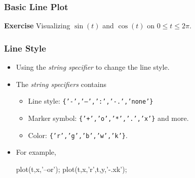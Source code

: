 \documentclass[compress]{beamer}  %
\begin{document}
\begin{frame}[fragile]
\frametitle{Basic Line Plot}
\textbf{Exercise} 
Visualizing $\sin(t)$ and $\cos(t)$ on $0 \leq t \leq 2\pi$. \pause
\begin{figure}[htb]
        \centering
\end{figure}

\end{frame}
\begin{frame}[fragile]
\frametitle{Line Style}

\begin{itemize}[<+->]
    \item Using the \textit{string specifier} to change the line style.
    \item The \textit{string specifiers} contains
          \begin{itemize}
          \item Line style: \texttt{\{'-','--',':','-.','none'\}}
          \item Marker symbol: \texttt{\{'+','o','*','.','x'\}} and more.
          \item Color: \texttt{\{'r','g','b','w','k'\}}.
          \end{itemize}
    \item For example,
          \begin{matlabcode}[numbers=none,frame=none]
          plot(t,x,'--or');
          plot(t,x,'r',t,y,'-.xk');
          \end{matlabcode}

\end{itemize}

\end{frame}
\end{document}
